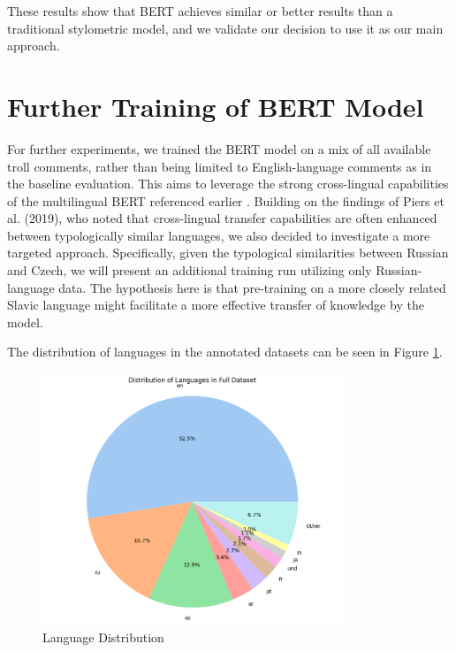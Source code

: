 \documentclass[twoside]{ctuthesis}
\theoremstyle{plain}
\theoremstyle{definition}
\theoremstyle{note}
\begin{document}
These results show that BERT achieves similar or better results than a traditional stylometric model, and we validate our decision to use it as our main approach.\par

\section{Further Training of BERT Model}

For further experiments, we trained the BERT model on a mix of all available troll comments, rather than being limited to English-language comments as in the baseline evaluation. This aims to leverage the strong cross-lingual capabilities of the multilingual BERT referenced earlier \cite{Pires2019}. Building on the findings of Piers et al. (2019), who noted that cross-lingual transfer capabilities are often enhanced between typologically similar languages, we also decided to investigate a more targeted approach. Specifically, given the typological similarities between Russian and Czech, we will present an additional training run utilizing only Russian-language data. The hypothesis here is that pre-training on a more closely related Slavic language might facilitate a more effective transfer of knowledge by the model.\par
The distribution of languages in the annotated datasets can be seen in Figure \ref{fig:language_distribution}.\par 

\begin{figure}[H]
  \centering
  \includegraphics[width=0.8\textwidth]{figures/language_distribution.png}
  \caption{Language Distribution}
  \label{fig:language_distribution}
\end{figure}
\end{document}
